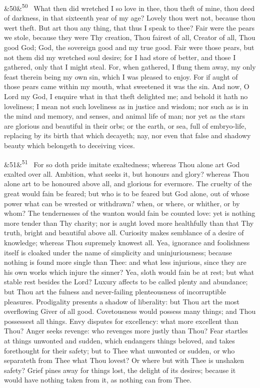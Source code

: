 \documentclass[12pt]{article}
\newcommand{\para}[1][]{\par\noindent\ifx&#1&\else\textsuperscript{\footnotesize #1}~\fi}
\begin{document}
\para[50] What then did wretched I so love in thee, thou theft of mine, thou deed of darkness, in that sixteenth year of my age? Lovely thou wert not, because thou wert theft. But art thou any thing, that thus I speak to thee? Fair were the pears we stole, because they were Thy creation, Thou fairest of all, Creator of all, Thou good God; God, the sovereign good and my true good. Fair were those pears, but not them did my wretched soul desire; for I had store of better, and those I gathered, only that I might steal. For, when gathered, I flung them away, my only feast therein being my own sin, which I was pleased to enjoy. For if aught of those pears came within my mouth, what sweetened it was the sin. And now, O Lord my God, I enquire what in that theft delighted me; and behold it hath no loveliness; I mean not such loveliness as in justice and wisdom; nor such as is in the mind and memory, and senses, and animal life of man; nor yet as the stars are glorious and beautiful in their orbs; or the earth, or sea, full of embryo-life, replacing by its birth that which decayeth; nay, nor even that false and shadowy beauty which belongeth to deceiving vices.

\para[51] For so doth pride imitate exaltedness; whereas Thou alone art God exalted over all. Ambition, what seeks it, but honours and glory? whereas Thou alone art to be honoured above all, and glorious for evermore. The cruelty of the great would fain be feared; but who is to be feared but God alone, out of whose power what can be wrested or withdrawn? when, or where, or whither, or by whom? The tendernesses of the wanton would fain be counted love: yet is nothing more tender than Thy charity; nor is aught loved more healthfully than that Thy truth, bright and beautiful above all. Curiosity makes semblance of a desire of knowledge; whereas Thou supremely knowest all. Yea, ignorance and foolishness itself is cloaked under the name of simplicity and uninjuriousness; because nothing is found more single than Thee: and what less injurious, since they are his own works which injure the sinner? Yea, sloth would fain be at rest; but what stable rest besides the Lord? Luxury affects to be called plenty and abundance; but Thou art the fulness and never-failing plenteousness of incorruptible pleasures. Prodigality presents a shadow of liberality: but Thou art the most overflowing Giver of all good. Covetousness would possess many things; and Thou possessest all things. Envy disputes for excellency: what more excellent than Thou? Anger seeks revenge: who revenges more justly than Thou? Fear startles at things unwonted and sudden, which endangers things beloved, and takes forethought for their safety; but to Thee what unwonted or sudden, or who separateth from Thee what Thou lovest? Or where but with Thee is unshaken safety? Grief pines away for things lost, the delight of its desires; because it would have nothing taken from it, as nothing can from Thee.
\end{document}

